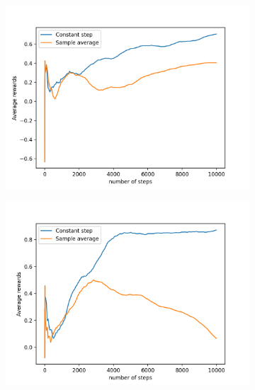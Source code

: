 \documentclass[12pt]{article}
\begin{document}
\begin{figure}
\begin{subfigure}{.5\textwidth}
  \centering
  \includegraphics[width=1.1\linewidth]{Figure_2.png}
  \caption{}
\end{subfigure}%
\begin{subfigure}{.5\textwidth}
  \centering
  \includegraphics[width=1.1\linewidth]{Figure_3.png}
  \caption{}
\end{subfigure}
\begin{subfigure}{.5\textwidth}
  \centering

\end{subfigure}
\end{figure}
\end{document}
